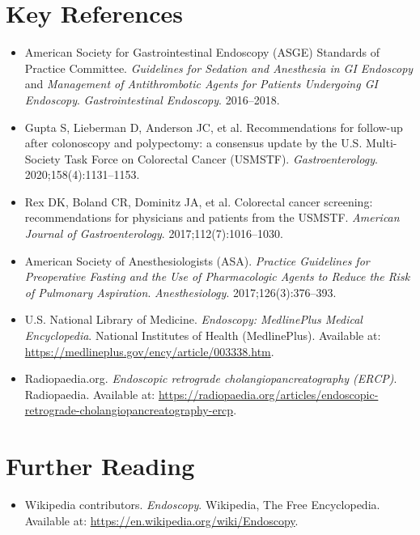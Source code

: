 \section{Key References}
\begin{itemize}
\item American Society for Gastrointestinal Endoscopy (ASGE) Standards of Practice Committee. \textit{Guidelines for Sedation and Anesthesia in GI Endoscopy} and \textit{Management of Antithrombotic Agents for Patients Undergoing GI Endoscopy}. \textit{Gastrointestinal Endoscopy}. 2016--2018.
\item Gupta S, Lieberman D, Anderson JC, et al. Recommendations for follow-up after colonoscopy and polypectomy: a consensus update by the U.S. Multi-Society Task Force on Colorectal Cancer (USMSTF). \textit{Gastroenterology}. 2020;158(4):1131--1153.
\item Rex DK, Boland CR, Dominitz JA, et al. Colorectal cancer screening: recommendations for physicians and patients from the USMSTF. \textit{American Journal of Gastroenterology}. 2017;112(7):1016--1030.
\item American Society of Anesthesiologists (ASA). \textit{Practice Guidelines for Preoperative Fasting and the Use of Pharmacologic Agents to Reduce the Risk of Pulmonary Aspiration}. \textit{Anesthesiology}. 2017;126(3):376--393.
\item U.S. National Library of Medicine. \textit{Endoscopy: MedlinePlus Medical Encyclopedia}. National Institutes of Health (MedlinePlus). Available at: \url{https://medlineplus.gov/ency/article/003338.htm}.
\item Radiopaedia.org. \textit{Endoscopic retrograde cholangiopancreatography (ERCP)}. Radiopaedia. Available at: \url{https://radiopaedia.org/articles/endoscopic-retrograde-cholangiopancreatography-ercp}.
\end{itemize}

\section{Further Reading}
\begin{itemize}
  \item Wikipedia contributors. \textit{Endoscopy}. Wikipedia, The Free Encyclopedia. Available at: \url{https://en.wikipedia.org/wiki/Endoscopy}.
\end{itemize}
